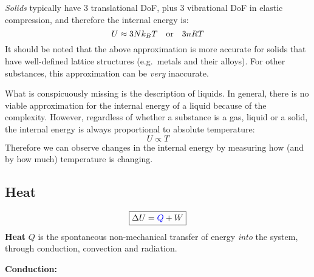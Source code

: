 \emph{Solids} typically have 3 translational DoF, plus 3 vibrational DoF in
elastic compression, and therefore the internal energy is:
\begin{equation}
  U\approx3Nk_BT\quad\text{\normalsize or}\quad 3nRT
\end{equation}
It should be noted that the above approximation is more accurate for solids
that have well-defined lattice structures (e.g.\ metals and their alloys). For
other substances, this approximation can be \emph{very} inaccurate.

What is conspicuously missing is the description of liquids. In general, there
is no viable approximation for the internal energy of a liquid because of the
complexity. However, regardless of whether a substance is a gas, liquid or a
solid, the internal energy is always proportional to absolute temperature:
\begin{equation}
  U\propto T
\end{equation}
Therefore we can observe changes in the internal energy by measuring how (and
by how much) temperature is changing.



\subsection{Heat}
\label{sec:heat-transfer}

{\large
  \begin{equation*}
    \boxed{
      \Delta U={\color{blue}Q} + W
    }
  \end{equation*}
}
\textbf{Heat} {\color{blue}$Q$} is the spontaneous non-mechanical transfer of
energy \emph{into} the system, through conduction, convection and radiation.

%
\textbf{Conduction:}

